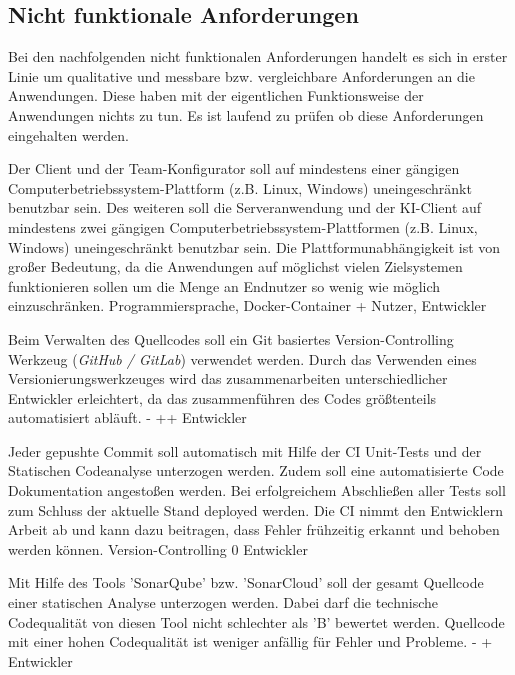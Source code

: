 \subsection{Nicht funktionale Anforderungen}

Bei den nachfolgenden nicht funktionalen Anforderungen handelt es sich in erster Linie um qualitative und messbare bzw. vergleichbare Anforderungen an die Anwendungen. Diese haben mit der eigentlichen Funktionsweise der Anwendungen nichts zu tun. Es ist laufend zu prüfen ob diese Anforderungen eingehalten werden.

        {Der Client und der Team-Konfigurator soll auf mindestens einer gängigen Computerbetriebssystem-Plattform (z.B. Linux, Windows) uneingeschränkt benutzbar sein. Des weiteren soll die Serveranwendung und der KI-Client auf mindestens zwei gängigen Computerbetriebssystem-Plattformen (z.B. Linux, Windows) uneingeschränkt benutzbar sein.}
        {Die Plattformunabhängigkeit ist von großer Bedeutung, da die Anwendungen auf möglichst vielen Zielsystemen funktionieren sollen um die Menge an Endnutzer so wenig wie möglich einzuschränken.}
        {Programmiersprache, Docker-Container}
        {+}
        {Nutzer, Entwickler}

        {Beim Verwalten des Quellcodes soll ein Git basiertes Version-Controlling Werkzeug (\textit{GitHub / GitLab}) verwendet werden.}
        {Durch das Verwenden eines Versionierungswerkzeuges wird das zusammenarbeiten unterschiedlicher Entwickler erleichtert, da das zusammenführen des Codes größtenteils automatisiert abläuft.}
        {-}
        {++}
        {Entwickler}

        {Jeder gepushte Commit soll automatisch mit Hilfe der CI Unit-Tests und der Statischen Codeanalyse unterzogen werden. Zudem soll eine automatisierte Code Dokumentation angestoßen werden. Bei erfolgreichem Abschließen aller Tests soll zum Schluss der aktuelle Stand deployed werden.}
        {Die CI nimmt den Entwicklern Arbeit ab und kann dazu beitragen, dass Fehler frühzeitig erkannt und behoben werden können.}
        {Version-Controlling}
        {0}
        {Entwickler}

        {Mit Hilfe des Tools 'SonarQube' bzw. 'SonarCloud' soll der gesamt Quellcode einer statischen Analyse unterzogen werden. Dabei darf die technische Codequalität von diesen Tool nicht schlechter als 'B' bewertet werden.}
        {Quellcode mit einer hohen Codequalität ist weniger anfällig für Fehler und Probleme.}
        {-}
        {+}
        {Entwickler}

